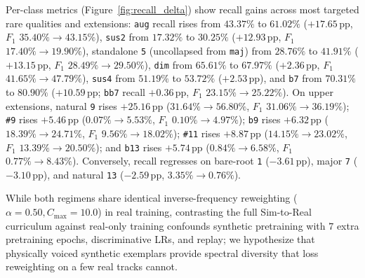 \documentclass{article}
\begin{document}
Per-class metrics (Figure~\ref{fig:recall_delta}) show recall gains across most targeted rare qualities and extensions: {\small\texttt{aug}} recall rises from $43.37\%$ to $61.02\%$ ($+17.65\,\text{pp}$, $F_1$ $35.40\% \!\to\! 43.15\%$), {\small\texttt{sus2}} from $17.32\%$ to $30.25\%$ ($+12.93\,\text{pp}$, $F_1$ $17.40\% \!\to\! 19.90\%$), standalone {\small\texttt{5}} (uncollapsed from {\small\texttt{maj}}) from $28.76\%$ to $41.91\%$ ($+13.15\,\text{pp}$, $F_1$ $28.49\% \!\to\! 29.50\%$), {\small\texttt{dim}} from $65.61\%$ to $67.97\%$ ($+2.36\,\text{pp}$, $F_1$ $41.65\% \!\to\! 47.79\%$), {\small\texttt{sus4}} from $51.19\%$ to $53.72\%$ ($+2.53\,\text{pp}$), and {\small\texttt{b7}} from $70.31\%$ to $80.90\%$ ($+10.59\,\text{pp}$; {\small\texttt{bb7}} recall $+0.36\,\text{pp}$, $F_1$ $23.15\% \!\to\! 25.22\%$). On upper extensions, natural {\small\texttt{9}} rises $+25.16\,\text{pp}$ ($31.64\% \!\to\! 56.80\%$, $F_1$ $31.06\% \!\to\! 36.19\%$); {\small\texttt{\#9}} rises $+5.46\,\text{pp}$ ($0.07\% \!\to\! 5.53\%$, $F_1$ $0.10\% \!\to\! 4.97\%$); {\small\texttt{b9}} rises $+6.32\,\text{pp}$ ($18.39\% \!\to\! 24.71\%$, $F_1$ $9.56\% \!\to\! 18.02\%$); {\small\texttt{\#11}} rises $+8.87\,\text{pp}$ ($14.15\% \!\to\! 23.02\%$, $F_1$ $13.39\% \!\to\! 20.50\%$); and {\small\texttt{b13}} rises $+5.74\,\text{pp}$ ($0.84\% \!\to\! 6.58\%$, $F_1$ $0.77\% \!\to\! 8.43\%$). Conversely, recall regresses on bare-root {\small\texttt{1}} ($-3.61\,\text{pp}$), major {\small\texttt{7}} ($-3.10\,\text{pp}$), and natural {\small\texttt{13}} ($-2.59\,\text{pp}$, $3.35\% \!\to\! 0.76\%$).

While both regimens share identical inverse-frequency reweighting ($\alpha=0.50, C_{\max}=10.0$) in real training, contrasting the full Sim-to-Real curriculum against real-only training confounds synthetic pretraining with $7$ extra pretraining epochs, discriminative LRs, and replay; we hypothesize that physically voiced synthetic exemplars provide spectral diversity that loss reweighting on a few real tracks cannot.
\end{document}
